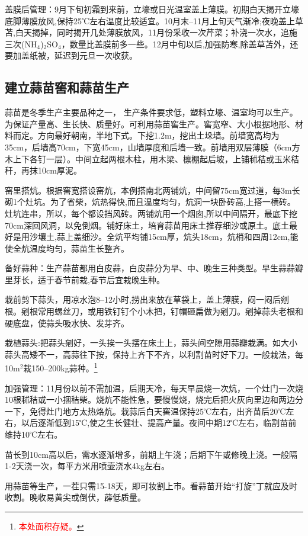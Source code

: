 \documentclass{ctexbook}
\begin{document}
盖膜后管理：9月下旬初霜到来前，立壕或日光温室盖上薄膜。初期白天揭开立壕底脚薄膜放风,保持25℃左右温度比较适宜。10月末--11月上旬天气渐冷;夜晚盖上草苫,白天揭掉，同时揭开几处薄膜放风，11月份采收一次芹菜；补浇一次水，追施三次(NH$_4$)$_2$SO$_4$，数量比盖膜前多一些。12月中旬以后,加强防寒,除盖草苫外，还要加盖纸被，延迟到元旦一次收获。
\subsection{建立蒜苗窖和蒜苗生产}
蒜苗是冬季生产主要品种之一，	生产条件要求低，塑料立壕、温室均可以生产。为保证产量高、生长快、质量好。可利用蒜苗窖生产。窖宽窄、大小根据地形、材料而定。方向最好朝南，半地下式。下挖1.2m，挖出土垛墙。前墙宽高均为35cm，后墙高70cm，下宽45cm，山墙厚度和后墙一致。前墙用双层薄膜（6cm方木上下各钉一层）。中间立起两根木柱，用木梁、檩棚起后坡，上铺秫秸或玉米秸秆，再抹10cm厚泥。

窑里搭炕。根据窖宽搭设窑炕，本例搭南北两铺炕，中间留75cm宽过道，每3m长砌1个灶坑。为了省柴，炕热得快,而且温度均匀，炕洞一块卧砖高,上搭一横砖。灶坑连串，所以，每个都设挡风砖。两铺炕用一个烟囱,所以中间隔开，最底下挖70cm深回风洞，以免倒烟。铺好床土，培育蒜苗用床土推荐细沙或原土。底土最好是用沙壤土,蒜上盖细沙。全炕平均铺15cm厚，炕头18cm，炕梢和四周12cm,能使全炕温度均匀，蒜苗生长整齐。

备好蒜种：生产蒜苗都用白皮蒜，白皮蒜分为早、中、晚生三种类型。早生蒜蒜瓣里芽长，适于春节前栽,春节后宜栽晚生种。

栽前剪下蒜头，用凉水泡8--12小时,捞出来放在草袋上，盖上薄膜，闷一闷后剜根。剜根常用螺丝刀，或用铁钉钉个小木把，钉帽砸扁做为剜刀。剜掉蒜头老根和硬底盘，使蒜头吸水快、发芽齐。

栽植蒜头:把蒜头剜好，一头挨一头摆在床土上，蒜头间空隙用蒜瓣栽满。如大小蒜头高矮不一，高蒜往下按，保持上齐下不齐，以利割苗时好下刀。一般栽法，每10m$^2$栽150--200kg蒜种。\footnote{\textcolor{red}{本处面积存疑。}}

加强管理：11月份以前不需加温，后期天冷，每天早晨烧一次炕，一个灶门一次烧10根秫秸或一小捆秸柴。烧炕不能性急，要慢慢烧，烧完后把火灰向里边和两边分一下，免得灶门地方太热烙炕。栽蒜后白天窖温保持25℃左右，出齐苗后20℃左右，以后逐渐低到15℃,使之生长健壮、提高产量。夜间中期12℃左右，临割苗前维持10℃左右。

苗长到10cm高以后，需水逐渐增多，前期上午浇；后期下午或修晚上浇。一般隔1-2天浇一次，每平方米用喷壶浇水4kg左右。

用蒜苗等生产，一茬只需15-18天，即可妆割上市。看蒜苗开始“打旋”丁就应及时收割。晚收易黄尖或倒伏，薜低质量。
\end{document}
